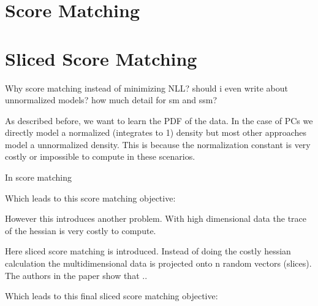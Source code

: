 \section{Score Matching}
\label{sec:sm}

\section{Sliced Score Matching}
\label{sec:ssm}

Why score matching instead of minimizing NLL? should i even write about unnormalized models?
how much detail for sm and ssm? 

As described before, we want to learn the PDF of the data. In the case of PCs we directly model a normalized (integrates to 1)
density but most other approaches model a unnormalized density. This is because the normalization constant is 
very costly or impossible to compute in these scenarios. 

In score matching \cite{score_matching} 

Which leads to this score matching objective: 



However this introduces another problem. With high dimensional data the trace of the hessian is very costly to compute.

Here sliced score matching \cite{sliced_score_matching} is introduced. Instead of doing the costly hessian calculation
the multidimensional data is projected onto n random vectors (slices). The authors in the paper show that ..

Which leads to this final sliced score matching objective: 








